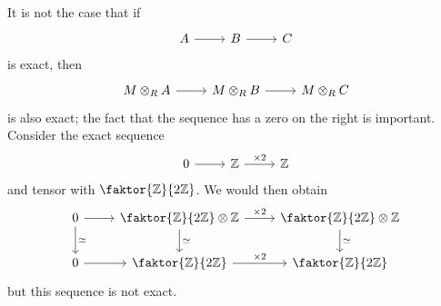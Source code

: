 \begin{remark}
    It is not the case that if
\[\begin{tikzcd}
	A & B & C
	\arrow[from=1-1, to=1-2]
	\arrow[from=1-2, to=1-3]
\end{tikzcd}\]
    is exact, then
\[\begin{tikzcd}
	{M \otimes_R A} & {M \otimes_R B} & {M \otimes_R C}
	\arrow[from=1-1, to=1-2]
	\arrow[from=1-2, to=1-3]
\end{tikzcd}\]
    is also exact; the fact that the sequence has a zero on the right is important.
    Consider the exact sequence
\[\begin{tikzcd}
	0 & {\mathbb Z} & {\mathbb Z}
	\arrow[from=1-1, to=1-2]
	\arrow["{\times 2}", from=1-2, to=1-3]
\end{tikzcd}\]
    and tensor with \( \faktor{\mathbb Z}{2\mathbb Z} \).
    We would then obtain
\[\begin{tikzcd}
	0 & {\faktor{\mathbb Z}{2\mathbb Z} \otimes \mathbb Z} & {\faktor{\mathbb Z}{2\mathbb Z} \otimes \mathbb Z} \\
	0 & {\faktor{\mathbb Z}{2\mathbb Z}} & {\faktor{\mathbb Z}{2\mathbb Z}}
	\arrow[from=1-1, to=1-2]
	\arrow["\times 2", from=1-2, to=1-3]
	\arrow["\simeq", from=1-1, to=2-1]
	\arrow["\simeq", from=1-2, to=2-2]
	\arrow["\simeq", from=1-3, to=2-3]
	\arrow[from=2-1, to=2-2]
	\arrow["\times 2", from=2-2, to=2-3]
\end{tikzcd}\]
    but this sequence is not exact.
\end{remark}

